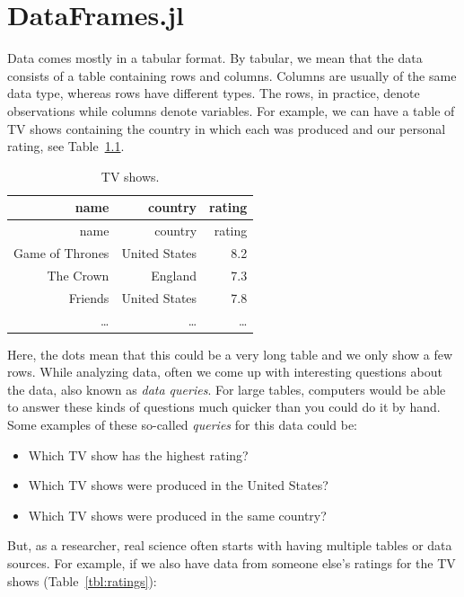 \documentclass[
  notoc %
]{tufte-book}
\providecommand{\tightlist}{%
  \setlength{\itemsep}{0pt}\setlength{\parskip}{0pt}
}
\begin{document}
\hypertarget{sec:dataframes}{%
\chapter{DataFrames.jl}\label{sec:dataframes}}

Data comes mostly in a tabular format. By tabular, we mean that the data
consists of a table containing rows and columns. Columns are usually of
the same data type, whereas rows have different types. The rows, in
practice, denote observations while columns denote variables. For
example, we can have a table of TV shows containing the country in which
each was produced and our personal rating, see Table~\ref{tbl:TV_shows}.

\hypertarget{tbl:TV_shows}{}
\begin{longtable}[]{@{}rrr@{}}
\caption{\label{tbl:TV_shows}TV shows.}\tabularnewline
\toprule
name & country & rating \\
\midrule
\endfirsthead
\toprule
name & country & rating \\
\midrule
\endhead
Game of Thrones & United States & 8.2 \\
The Crown & England & 7.3 \\
Friends & United States & 7.8 \\
\ldots{} & \ldots{} & \ldots{} \\
\bottomrule
\end{longtable}

Here, the dots mean that this could be a very long table and we only
show a few rows. While analyzing data, often we come up with interesting
questions about the data, also known as \emph{data queries}. For large
tables, computers would be able to answer these kinds of questions much
quicker than you could do it by hand. Some examples of these so-called
\emph{queries} for this data could be:

\begin{itemize}
\tightlist
\item
  Which TV show has the highest rating?
\item
  Which TV shows were produced in the United States?
\item
  Which TV shows were produced in the same country?
\end{itemize}

But, as a researcher, real science often starts with having multiple
tables or data sources. For example, if we also have data from someone
else's ratings for the TV shows (Table~\ref{tbl:ratings}):
\end{document}

